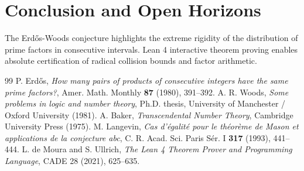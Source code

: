 \documentclass[11pt,a4paper]{article}
\theoremstyle{definition}
\begin{document}
\section{Conclusion and Open Horizons}
The Erd\H{o}s-Woods conjecture highlights the extreme rigidity of the distribution of prime factors in consecutive intervals. Lean 4 interactive theorem proving enables absolute certification of radical collision bounds and factor arithmetic.

\begin{thebibliography}{99}
 P. Erd\H{o}s, \textit{How many pairs of products of consecutive integers have the same prime factors?}, Amer. Math. Monthly \textbf{87} (1980), 391--392.
 A. R. Woods, \textit{Some problems in logic and number theory}, Ph.D. thesis, University of Manchester / Oxford University (1981).
 A. Baker, \textit{Transcendental Number Theory}, Cambridge University Press (1975).
 M. Langevin, \textit{Cas d'\'egalit\'e pour le th\'eor\`eme de Mason et applications de la conjecture abc}, C. R. Acad. Sci. Paris S\'er. I \textbf{317} (1993), 441--444.
 L. de Moura and S. Ullrich, \textit{The Lean 4 Theorem Prover and Programming Language}, CADE 28 (2021), 625--635.
\end{thebibliography}
\end{document}

